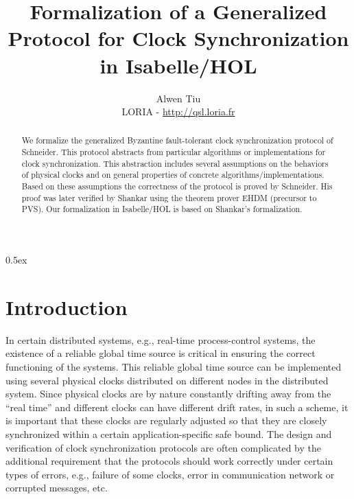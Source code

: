 \documentclass[11pt,a4paper]{article}
\begin{document}
\title{Formalization of a Generalized Protocol for 
Clock Synchronization in Isabelle/HOL}
\author{Alwen Tiu \\
LORIA - \url{http://qsl.loria.fr}}
\maketitle


\begin{abstract}
We formalize the generalized Byzantine fault-tolerant clock synchronization 
protocol of Schneider. 
This protocol abstracts from particular algorithms or implementations
for clock synchronization. This abstraction includes several
assumptions on the behaviors of physical clocks and on general
properties of concrete algorithms/implementations. Based on these assumptions
the correctness of the protocol is proved by Schneider. 
His proof was later verified by Shankar using the theorem prover EHDM
(precursor to PVS). Our formalization in Isabelle/HOL is based on
Shankar's formalization. 
\end{abstract}

\tableofcontents

\parindent 0pt\parskip 0.5ex

\section{Introduction}

In certain distributed systems, e.g., real-time process-control
systems, the existence of a reliable global time source is critical in
ensuring the correct functioning of the systems.
This reliable global time source can be implemented using
several physical clocks distributed on different nodes in the
distributed system. Since physical clocks are by nature constantly
drifting away from the ``real time'' and different clocks can have
different drift rates, in such a scheme, it is important that these
clocks are regularly adjusted so that they are closely synchronized
within a certain application-specific safe bound. The design and
verification of clock synchronization protocols are often complicated
by the additional requirement that the protocols should work correctly
under certain types of errors, e.g., failure of some clocks, error in
communication network or corrupted messages, etc.
\end{document}
